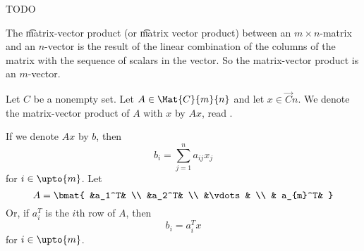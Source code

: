 

TODO


The \t{matrix-vector product} (or \t{matrix vector product}) between an $m \times n$-matrix and an $n$-vector is the result of the linear combination of the columns of the matrix with the sequence of scalars in the vector.
So the matrix-vector product is an $m$-vector.


Let $C$ be a nonempty set.
Let $A \in \Mat{C}{m}{n}$ and let $x \in \Vec{C}{n}$. We denote the matrix-vector product of $A$ with $x$ by $Ax$, read .

If we denote $Ax$ by $b$, then
$$
  b_i = \sum_{j = 1}^{n} a_{ij}x_j
$$
for $i \in \upto{m}$.
Let
$$
  A = \bmat{
    &a_1^T& \\
    &a_2^T& \\
    &\vdots & \\
    & a_{m}^T&
  }
$$
Or, if $a_i^T$ is the $i$th row of $A$, then
$$
  b_i = a_i^T x
$$
for $i \in \upto{m}$.
